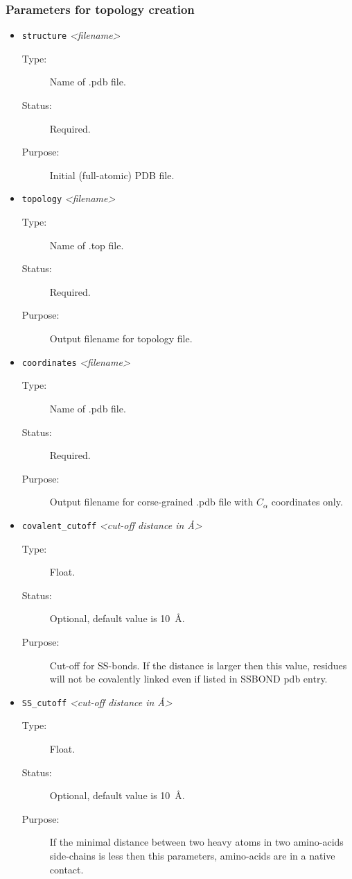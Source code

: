 \documentclass[a4paper]{article}
\begin{document}
\subsubsection{Parameters for topology creation}
\begin{itemize}

\item \texttt{structure} \textit{\textless filename\textgreater}
\begin{description}
\item[Type:] Name of .pdb file.
\item[Status:] Required.
\item[Purpose:] Initial (full-atomic) PDB file.
\end{description}

\item \texttt{topology} \textit{\textless filename\textgreater}
\begin{description}
\item[Type:] Name of .top file.
\item[Status:] Required.
\item[Purpose:] Output filename for topology file.
\end{description}

\item \texttt{coordinates} \textit{\textless filename\textgreater}
\begin{description}
\item[Type:] Name of .pdb file.
\item[Status:] Required.
\item[Purpose:] Output filename for corse-grained .pdb file with $C_{\alpha}$ coordinates only.
\end{description}

\item \texttt{covalent\_cutoff} \textit{\textless cut-off distance in \AA\textgreater}
\begin{description}
\item[Type:] Float.
\item[Status:] Optional, default value is 10~\AA.
\item[Purpose:] Cut-off for SS-bonds. If the distance is larger then this value, residues will not be covalently linked even if listed in SSBOND pdb entry.
\end{description}

\item \texttt{SS\_cutoff} \textit{\textless cut-off distance in \AA\textgreater}
\begin{description}
\item[Type:] Float.
\item[Status:] Optional, default value is 10~\AA.
\item[Purpose:] If the minimal distance between two heavy atoms in two amino-acids side-chains is less then this parameters, amino-acids are in a native contact.
\end{description}


\end{itemize}
\end{document}
